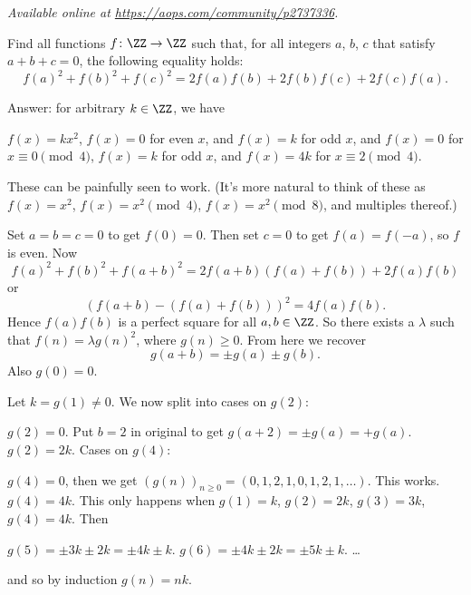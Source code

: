 \textsl{Available online at \url{https://aops.com/community/p2737336}.}
\begin{mdframed}[style=mdpurplebox,frametitle={Problem statement}]
Find all functions $f \colon \ZZ \to \ZZ$ such that,
for all integers $a$, $b$, $c$ that satisfy $a+b+c=0$,
the following equality holds:
\[ f(a)^2+f(b)^2+f(c)^2 = 2f(a)f(b)+2f(b)f(c)+2f(c)f(a). \]
\end{mdframed}
Answer: for arbitrary $k \in \ZZ$, we have
\begin{enumerate}[(i)]
  \ii $f(x) = kx^2$,
  \ii $f(x) = 0$ for even $x$, and $f(x) = k$ for odd $x$, and
  \ii $f(x) = 0$ for $x \equiv 0 \pmod 4$,
  $f(x) = k$ for odd $x$, and $f(x) = 4k$ for $x \equiv 2 \pmod 4$.
\end{enumerate}
These can be painfully seen to work.
(It's more natural to think of these as
$f(x) = x^2$, $f(x) = x^2 \pmod 4$, $f(x) = x^2 \pmod 8$,
and multiples thereof.)

Set $a=b=c=0$ to get $f(0)=0$.
Then set $c=0$ to get $f(a) = f(-a)$, so $f$ is even.
Now \[ f(a)^2 + f(b)^2 + f(a+b)^2
= 2f(a+b)\left( f(a)+f(b) \right) + 2f(a)f(b) \]
or
\[ \left( f(a+b) - \left( f(a)+f(b) \right) \right)^2
  = 4f(a)f(b). \]
Hence $f(a)f(b)$ is a perfect square for all $a,b \in \ZZ$.
So there exists a $\lambda$ such that $f(n) = \lambda g(n)^2$, where $g(n) \ge 0$.
From here we recover
\[ \boxed{g(a+b) = \pm g(a) \pm g(b)}. \]
Also $g(0) = 0$.

Let $k = g(1) \neq 0$.
We now split into cases on $g(2)$:
\begin{itemize}
  \ii $g(2) = 0$. Put $b = 2$ in original to get
  $g(a+2) = \pm g(a) = +g(a)$.
  \ii $g(2) = 2k$. Cases on $g(4)$:
  \begin{itemize}
    \ii $g(4) = 0$, then we get
    $(g(n))_{n\ge0} = (0,1,2,1,0,1,2,1,\dots)$.  This works.
    \ii $g(4) = 4k$. This only happens when
    $g(1) = k$, $g(2) = 2k$, $g(3) = 3k$, $g(4) = 4k$.
    Then
    \begin{itemize}
      \ii $g(5) = \pm 3k \pm 2k = \pm 4k \pm k$.
      \ii $g(6) = \pm4k \pm 2k = \pm5k \pm k$.
      \ii \dots
    \end{itemize}
    and so by induction $g(n) = nk$.
  \end{itemize}
\end{itemize}
\pagebreak
